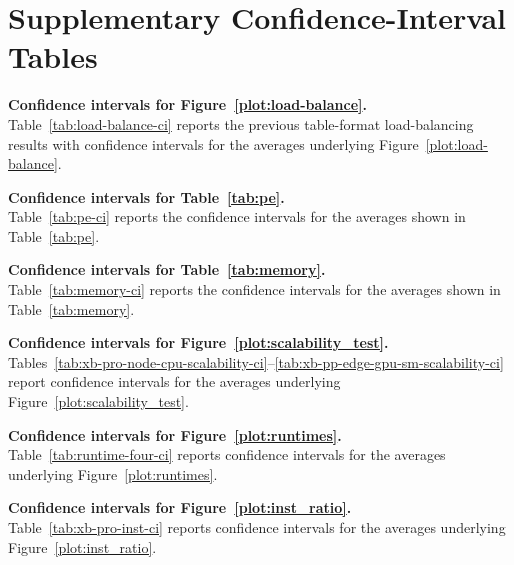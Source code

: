 \section{Supplementary Confidence-Interval Tables}
\label{expr:ci_tables}

\noindent\textbf{Confidence intervals for Figure~\ref{plot:load-balance}.}\\
  Table~\ref{tab:load-balance-ci} reports the previous table-format load-balancing results with confidence intervals for the averages underlying Figure~\ref{plot:load-balance}.



\noindent\textbf{Confidence intervals for Table~\ref{tab:pe}.}\\
  Table~\ref{tab:pe-ci} reports the confidence intervals for the averages shown in Table~\ref{tab:pe}.



\noindent\textbf{Confidence intervals for Table~\ref{tab:memory}.}\\
  Table~\ref{tab:memory-ci} reports the confidence intervals for the averages shown in Table~\ref{tab:memory}.



\noindent\textbf{Confidence intervals for Figure~\ref{plot:scalability_test}.}\\
  Tables~\ref{tab:xb-pro-node-cpu-scalability-ci}--\ref{tab:xb-pp-edge-gpu-sm-scalability-ci} report confidence intervals for the averages underlying Figure~\ref{plot:scalability_test}.


    

    

    


\noindent\textbf{Confidence intervals for Figure~\ref{plot:runtimes}.}\\
  Table~\ref{tab:runtime-four-ci} reports confidence intervals for the averages underlying Figure~\ref{plot:runtimes}.




\noindent\textbf{Confidence intervals for Figure~\ref{plot:inst_ratio}.}\\
  Table~\ref{tab:xb-pro-inst-ci} reports confidence intervals for the averages underlying Figure~\ref{plot:inst_ratio}.
  

\FloatBarrier
